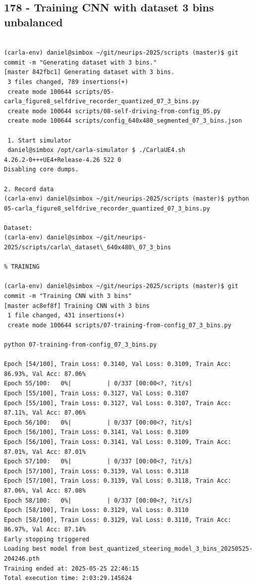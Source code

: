 \subsection{178 - Training CNN with dataset 3 bins unbalanced}
\label{app_res:178}

\begin{verbatim}

(carla-env) daniel@simbox ~/git/neurips-2025/scripts (master)$ git commit -m "Generating dataset with 3 bins."
[master 842fbc1] Generating dataset with 3 bins.
 3 files changed, 789 insertions(+)
 create mode 100644 scripts/05-carla_figure8_selfdrive_recorder_quantized_07_3_bins.py
 create mode 100644 scripts/08-self-driving-from-config_05.py
 create mode 100644 scripts/config_640x480_segmented_07_3_bins.json

 1. Start simulator
 daniel@simbox /opt/carla-simulator $ ./CarlaUE4.sh 
4.26.2-0+++UE4+Release-4.26 522 0
Disabling core dumps.

2. Record data
(carla-env) daniel@simbox ~/git/neurips-2025/scripts (master)$ python 05-carla_figure8_selfdrive_recorder_quantized_07_3_bins.py

Dataset:
(carla-env) daniel@simbox ~/git/neurips-2025/scripts/carla\_dataset\_640x480\_07_3_bins

% TRAINING

(carla-env) daniel@simbox ~/git/neurips-2025/scripts (master)$ git commit -m "Training CNN with 3 bins"
[master ac8ef8f] Training CNN with 3 bins
 1 file changed, 431 insertions(+)
 create mode 100644 scripts/07-training-from-config_07_3_bins.py
 
python 07-training-from-config_07_3_bins.py

Epoch [54/100], Train Loss: 0.3140, Val Loss: 0.3109, Train Acc: 86.93%, Val Acc: 87.06%
Epoch 55/100:   0%|          | 0/337 [00:00<?, ?it/s]
Epoch [55/100], Train Loss: 0.3127, Val Loss: 0.3107
Epoch [55/100], Train Loss: 0.3127, Val Loss: 0.3107, Train Acc: 87.11%, Val Acc: 87.06%
Epoch 56/100:   0%|          | 0/337 [00:00<?, ?it/s]
Epoch [56/100], Train Loss: 0.3141, Val Loss: 0.3109
Epoch [56/100], Train Loss: 0.3141, Val Loss: 0.3109, Train Acc: 87.01%, Val Acc: 87.01%
Epoch 57/100:   0%|          | 0/337 [00:00<?, ?it/s]
Epoch [57/100], Train Loss: 0.3139, Val Loss: 0.3118
Epoch [57/100], Train Loss: 0.3139, Val Loss: 0.3118, Train Acc: 87.06%, Val Acc: 87.08%
Epoch 58/100:   0%|          | 0/337 [00:00<?, ?it/s]
Epoch [58/100], Train Loss: 0.3129, Val Loss: 0.3110
Epoch [58/100], Train Loss: 0.3129, Val Loss: 0.3110, Train Acc: 86.97%, Val Acc: 87.14%
Early stopping triggered
Loading best model from best_quantized_steering_model_3_bins_20250525-204246.pth
Training ended at: 2025-05-25 22:46:15
Total execution time: 2:03:29.145624



\end{verbatim}


